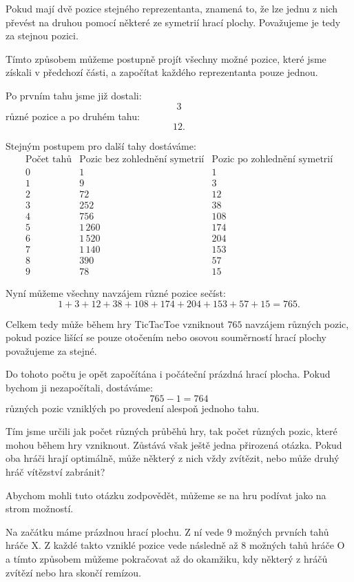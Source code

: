 \documentclass[12pt,a4paper]{article}
\begin{document}
Pokud mají dvě pozice stejného reprezentanta, znamená to, 
že lze jednu z nich převést na druhou pomocí některé ze symetrií hrací plochy. 
Považujeme je tedy za stejnou pozici.

Tímto způsobem můžeme postupně projít všechny možné pozice, 
které jsme získali v předchozí části, a započítat každého reprezentanta pouze jednou.

Po prvním tahu jsme již dostali:
\[
    3
\]
různé pozice a po druhém tahu:
\[
    12.
\]

Stejným postupem pro další tahy dostáváme:
\[
\begin{array}{c|c|c}
    \text{Počet tahů} & \text{Pozic bez zohlednění symetrií} & \text{Pozic po zohlednění symetrií} \\
    \hline
    0 & 1 & 1 \\
    1 & 9 & 3 \\
    2 & 72 & 12 \\
    3 & 252 & 38 \\
    4 & 756 & 108 \\
    5 & 1\,260 & 174 \\
    6 & 1\,520 & 204 \\
    7 & 1\,140 & 153 \\
    8 & 390 & 57 \\
    9 & 78 & 15
\end{array}
\]

Nyní můžeme všechny navzájem různé pozice sečíst:
\begin{equation}
    1+3+12+38+108+174+204+153+57+15=765.
\end{equation}

Celkem tedy může během hry TicTacToe vzniknout $765$ navzájem různých pozic, 
pokud pozice lišící se pouze otočením nebo osovou souměrností hrací plochy považujeme za stejné.

Do tohoto počtu je opět započítána i počáteční prázdná hrací plocha. 
Pokud bychom ji nezapočítali, dostáváme:
\[
    765-1=764
\]
různých pozic vzniklých po provedení alespoň jednoho tahu.

Tím jsme určili jak počet různých průběhů hry, tak počet různých pozic,
které mohou během hry vzniknout. 
Zůstává však ještě jedna přirozená otázka. 
Pokud oba hráči hrají optimálně, může některý z nich vždy zvítězit, 
nebo může druhý hráč vítězství zabránit?

Abychom mohli tuto otázku zodpovědět, můžeme se na hru podívat jako na strom možností.

Na začátku máme prázdnou hrací plochu. Z ní vede 9 možných prvních tahů hráče $\mathrm{X}$.
Z každé takto vzniklé pozice vede následně až 8 možných tahů hráče $\mathrm{O}$ a tímto způsobem můžeme pokračovat až do okamžiku, kdy některý z hráčů zvítězí nebo hra skončí remízou.
\end{document}

